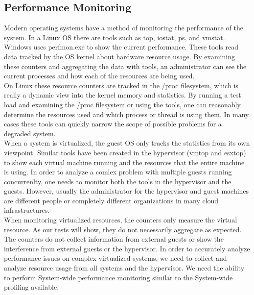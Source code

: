 \subsection{Performance Monitoring}
Modern operating systems have a method of monitoring the performance of the system.  In a Linux OS there are tools such as top, iostat, ps, and vmstat.  
Windows uses perfmon.exe to show the current performance.  
These tools read data tracked by the OS kernel about hardware resource usage.  
By examining these counters and aggregating the data with tools, an administrator can see the current processes and how each of the resources are being used. \\ 
\indent On Linux these resource counters are tracked in the /proc filesystem, which is really a dynamic view into the kernel memory and statistics.  
By running a test load and examining the /proc filesystem or using the tools, one can reasonably determine the resources used and which process or thread is using them.  
In many cases these tools can quickly narrow the scope of possible problems for a degraded system. \\

\indent When a system is virtualized, the guest OS only tracks the statistics from its own viewpoint.  
Similar tools have been created in the hypervisor (vmtop and esxtop) to show each virtual machine running and the resources that the entire machine is using.  
In order to analyze a comlex problem with multiple guests running concurrenlty, one needs to monitor both the tools in the hypervisor and the guests.  
However, usually the administrator for the hypervisor and guest machines are different people or completely different organizations in many cloud infrastructures.  \\

\indent When monitoring virtualized resources, the counters only measure the virtual resource.  
As our tests will show, they do not necessarily aggregate as expected.  
The counters do not collect information from external guests or show the interference from external guests or the hypervisor.  
In order to accurately analyze performance issues on complex virtualized systems, we need to collect and analyze resource usage from all systems and the hypervisor.  
We need the ability to perform System-wide performance monitoring similar to the System-wide profiling available.

